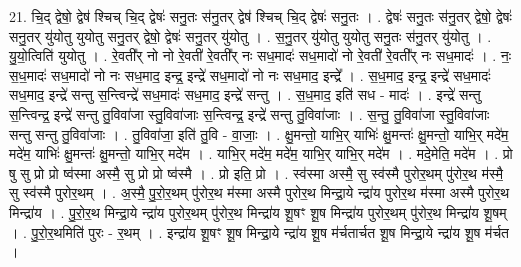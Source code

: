 \documentclass[17pt]{extarticle}
\begin{document}
21. चि॒द् द्वेषो॒ द्वेष॑ श्चिच् चि॒द् द्वेषः॑ सनु॒तः स॑नु॒तर् द्वेष॑ श्चिच् चि॒द् द्वेषः॑ सनु॒तः । . द्वेषः॑ सनु॒तः स॑नु॒तर् द्वेषो॒ द्वेषः॑ सनु॒तर् यु॑योतु युयोतु सनु॒तर् द्वेषो॒ द्वेषः॑ सनु॒तर् यु॑योतु । . स॒नु॒तर् यु॑योतु युयोतु सनु॒तः स॑नु॒तर् यु॑योतु । . यु॒यो॒त्विति॑ युयोतु । . रे॒वती᳚र् नो नो रे॒वती॑ रे॒वती᳚र् नः सध॒मादः॑ सध॒मादो॑ नो रे॒वती॑ रे॒वती᳚र् नः सध॒मादः॑ । . नः॒ स॒ध॒मादः॑ सध॒मादो॑ नो नः सध॒माद॒ इन्द्र॒ इन्द्रे॑ सध॒मादो॑ नो नः सध॒माद॒ इन्द्रे᳚ । . स॒ध॒माद॒ इन्द्र॒ इन्द्रे॑ सध॒मादः॑ सध॒माद॒ इन्द्रे॑ सन्तु स॒न्त्विन्द्रे॑ सध॒मादः॑ सध॒माद॒ इन्द्रे॑ सन्तु । . स॒ध॒माद॒ इति॑ सध - मादः॑ । . इन्द्रे॑ सन्तु स॒न्त्विन्द्र॒ इन्द्रे॑ सन्तु तु॒विवा॑जा स्तु॒विवा॑जाः स॒न्त्विन्द्र॒ इन्द्रे॑ सन्तु तु॒विवा॑जाः । . स॒न्तु॒ तु॒विवा॑जा स्तु॒विवा॑जाः सन्तु सन्तु तु॒विवा॑जाः । . तु॒विवा॑जा॒ इति॑ तु॒वि - वा॒जाः॒ । . क्षु॒मन्तो॒ याभि॒र् याभिः॑ क्षु॒मन्तः॑ क्षु॒मन्तो॒ याभि॒र् मदे॑म॒ मदे॑म॒ याभिः॑ क्षु॒मन्तः॑ क्षु॒मन्तो॒ याभि॒र् मदे॑म । . याभि॒र् मदे॑म॒ मदे॑म॒ याभि॒र् याभि॒र् मदे॑म । . मदे॒मेति॒ मदे॑म । . प्रो षु सु प्रो प्रो ष्व॑स्मा अस्मै॒ सु प्रो प्रो ष्व॑स्मै । . प्रो इति॒ प्रो । . स्व॑स्मा अस्मै॒ सु स्व॑स्मै पुरोर॒थम् पु॑रोर॒थ म॑स्मै॒ सु स्व॑स्मै पुरोर॒थम् । . अ॒स्मै॒ पु॒रो॒र॒थम् पु॑रोर॒थ म॑स्मा अस्मै पुरोर॒थ मिन्द्रा॒ये न्द्रा॑य पुरोर॒थ म॑स्मा अस्मै पुरोर॒थ मिन्द्रा॑य । . पु॒रो॒र॒थ मिन्द्रा॒ये न्द्रा॑य पुरोर॒थम् पु॑रोर॒थ मिन्द्रा॑य शू॒षꣳ शू॒ष मिन्द्रा॑य पुरोर॒थम् पु॑रोर॒थ मिन्द्रा॑य शू॒षम् । . पु॒रो॒र॒थमिति॑ पुरः - र॒थम् । . इन्द्रा॑य शू॒षꣳ शू॒ष मिन्द्रा॒ये न्द्रा॑य शू॒ष म॑र्चतार्चत शू॒ष मिन्द्रा॒ये न्द्रा॑य शू॒ष म॑र्चत । \newline
\end{document}
